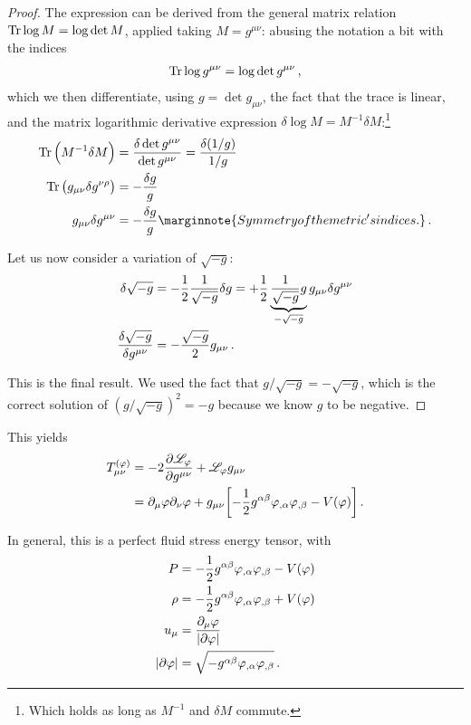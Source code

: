 \documentclass[main.tex]{subfiles}
\begin{document}
\begin{proof}
The expression can be derived from the general matrix relation  \(\Tr \log M = \log \det M\), applied taking \(M = g^{\mu \nu }\): abusing the notation a bit with the indices
%
\begin{align}
\Tr \log g^{\mu \nu } = \log \det g^{\mu \nu } 
\,,
\end{align}
%
which we then differentiate, using \(g = \det g_{\mu \nu }\), the fact that the trace is linear, and the matrix logarithmic derivative expression \(\delta \log M = M^{-1} \delta M\):\footnote{Which holds as long as \(M^{-1}\) and \(\delta M\) commute. }
%
\begin{align}
\Tr \qty(M^{-1} \delta M) &= \frac{ \delta \det g^{\mu \nu }}{\det g^{\mu \nu }} = \frac{ \delta (1/g)}{ 1/g}  \\
\Tr \qty(g_{\mu \nu } \delta g^{\nu \rho }) &= - \frac{ \delta g}{g}  \\
g_{\mu \nu } \delta g^{\mu \nu } &= - \frac{ \delta g}{g}
\marginnote{Symmetry of the metric's indices.}
\,.
\end{align}

Let us now consider a variation of \(\sqrt{-g}\): 
%
\begin{align}
\delta \sqrt{-g} &= - \frac{1}{2} \frac{1}{\sqrt{-g}} \delta g = + \frac{1}{2} \underbrace{\frac{1}{\sqrt{-g}} g}_{-\sqrt{-g}} g_{\mu \nu } \delta g^{\mu \nu }   \\
\fdv{\sqrt{-g}}{g^{\mu \nu }} &= - \frac{\sqrt{-g}}{2} g_{\mu \nu }
\,.
\end{align}

This is the final result. We used the fact that \(g / \sqrt{-g} = - \sqrt{-g}\), which is the correct solution of \((g / \sqrt{-g})^2 = -g\) because we know  \(g\) to be negative.
\end{proof}

This yields 
%
\begin{align}
T^{(\varphi )}_{\mu \nu }  &= 
- 2 \pdv{\mathscr{L}_\varphi }{g^{\mu \nu }} + \mathscr{L}_\varphi g_{\mu \nu }
\\
&= \partial_{\mu } \varphi \partial_{\nu } \varphi 
+ g_{\mu \nu } \qty[- \frac{1}{2} g^{\alpha \beta } \varphi_{, \alpha } \varphi_{, \beta } - V(\varphi )] 
\,.
\end{align}

\begin{claim}
In general, this is a perfect fluid stress energy tensor, with 
%
\begin{align}
P &= -\frac{1}{2} g^{\alpha \beta } \varphi_{, \alpha } \varphi_{, \beta } - V(\varphi )  \\
\rho &= - \frac{1}{2} g^{\alpha \beta } \varphi_{, \alpha } \varphi_{, \beta }  + V(\varphi ) \\
u_\mu &= \frac{\partial_{\mu}\varphi}{\abs{\partial \varphi }}  \\
\abs{\partial \varphi} &= \sqrt{- g^{\alpha \beta } \varphi_{, \alpha } \varphi_{, \beta }}
\,.
\end{align}
\end{claim}
\end{document}

